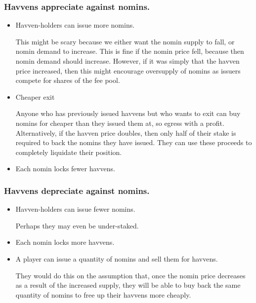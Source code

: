 \subsubsection{Havvens appreciate against nomins.} \label{sec:havven-nomin-appreciation}
\begin{itemize}
	\item{Havven-holders can issue more nomins.}

	This might be scary because we either want the nomin supply to fall, or nomin demand to increase.
	This is fine if the nomin price fell, because then nomin demand should increase.
	However, if it was simply that the havven price increased, then this might encourage
	oversupply of nomins as issuers compete for shares of the fee pool.

	\item{Cheaper exit}

	Anyone who has previously issued havvens but who wants to exit can buy nomins for
	cheaper than they issued them at, so egress with a profit.
	Alternatively, if the havven price doubles, then only half of their stake is required
	to back the nomins they have issued. They can use these proceeds to completely liquidate
	their position.

	\item{Each nomin locks fewer havvens.}
	
\end{itemize}

\subsubsection{Havvens depreciate against nomins.} \label{sec:havven-nomin-depreciation}

\begin{itemize}
	\item{Havven-holders can issue fewer nomins.}
	
	Perhaps they may even be under-staked.

	\item{Each nomin locks more havvens.}
	\item{A player can issue a quantity of nomins and sell them for havvens.}
		  
	They would do this on the assumption that, once the nomin price decreases as a result of the increased
	supply, they will be able to buy back the same quantity of nomins to free up their
	havvens more cheaply.
\end{itemize}

